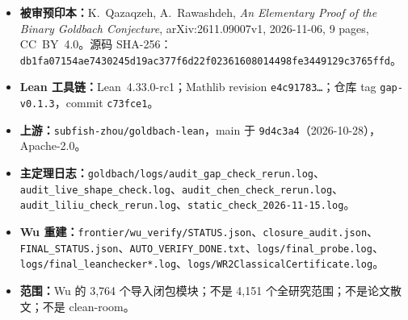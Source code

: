 \documentclass[11pt,a4paper]{ctexart}
\theoremstyle{plain}
\theoremstyle{definition}
\begin{document}
\begin{itemize}
\item \textbf{被审预印本：}K.~Qazaqzeh, A.~Rawashdeh, \emph{An Elementary Proof of the Binary Goldbach Conjecture}, arXiv:2611.09007v1, 2026-11-06, 9 pages, CC~BY~4.0。源码 SHA-256：\texttt{db1fa07154ae7430245d19ac377f6d22f02361608014498fe3449129c3765ffd}。
\item \textbf{Lean 工具链：}Lean~4.33.0-rc1；Mathlib revision \texttt{e4c91783\ldots}；仓库 tag \texttt{gap-v0.1.3}，commit \texttt{c73fce1}。
\item \textbf{上游：}\texttt{subfish-zhou/goldbach-lean}，main 于 \texttt{9d4c3a4}（2026-10-28），Apache-2.0。
\item \raggedright \textbf{主定理日志：}\texttt{goldbach/logs/audit\_gap\_check\_rerun.log}、\texttt{audit\_live\_shape\_check.log}、\texttt{audit\_chen\_check\_rerun.log}、\texttt{audit\_liliu\_check\_rerun.log}、\texttt{static\_check\_2026-11-15.log}。
\item \textbf{Wu 重建：}\texttt{frontier/wu\_verify/STATUS.json}、\texttt{closure\_audit.json}、\texttt{FINAL\_STATUS.json}、\texttt{AUTO\_VERIFY\_DONE.txt}、\texttt{logs/final\_probe.log}、\texttt{logs/final\_leanchecker*.log}、\texttt{logs/WR2ClassicalCertificate.log}。
\item \textbf{范围：}Wu 的 3,764 个导入闭包模块；不是 4,151 个全研究范围；不是论文散文；不是 clean-room。
\end{itemize}
\end{document}
